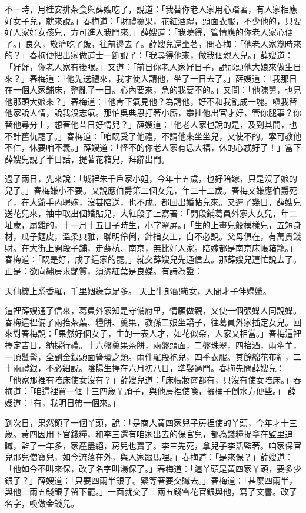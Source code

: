 \begin{showcontents}{}
不一時，月桂安排茶食與薛嫂吃了，說道：「我替你老人家用心踏著，有人家相應好女子兒，就來說。」春梅道：「財禮羹果，花紅酒禮，頭面衣服，不少他的，只要好人家好女孩兒，方可進入我門來。」薛嫂道：「我曉得，管情應的你老人家心便了。」良久，敬濟吃了飯，往前邊去了。薛嫂兒還坐著，問春梅：「他老人家幾時來的？」春梅便把出家做道士一節說了：「我尋得他來，做我個親人兒。」薛嫂道：「好好，你老人家有後眼。」又道：「前日你老人家好日子，說那頭他大娘來做生日來？」春梅道：「他先送禮來，我才使人請他，坐了一日去了。」薛嫂道：「我那日在一個人家鋪床，整亂了一日。心內要來，急的我要不的。」又問：「他陳舅，也見他那頭大娘來？」春梅道：「他肯下氣見他？為請他，好不和我亂成一塊。嗔我替他家說人情，說我沒志氣。那怕吳典恩打著小廝，攀扯他出官才好，管你腿事？你替他尋分上，想著他昔日好情兒？」薛嫂道：「他老人家也說的是，及到其間，也不計舊仇罷了。」春梅道：「咱既受了他禮，不請他來坐坐兒，又使不的。寧可教他不仁，休要咱不義。」薛嫂道：「怪不的你老人家有恁大福，休的心忒好了！」當下薛嫂兒說了半日話，提著花箱兒，拜辭出門。

過了兩日，先來說：「城裡朱千戶家小姐，今年十五歲，也好陪嫁，只是沒了娘的兒了。」春梅嫌小不要。又說應伯爵第二個女兒，年二十二歲。春梅又嫌應伯爵死了，在大爺手內聘嫁，沒甚陪送，也不成。都回出婚帖兒來。又遲了幾日，薛嫂兒送花兒來，袖中取出個婚貼兒，大紅段子上寫著：「開段鋪葛員外家大女兒，年二址歲，屬雞的，十一月十五日子時生，小字翠屏。」「生的上畫兒般模樣兒，五短身材，瓜子麵皮，溫柔典雅，聯明伶俐，針指女工，自不必說。父母俱在，有萬貫錢財。在大街上開段子鋪，走蘇杭、南京，無比好人家。陪嫁都是南京床帳箱籠。」春梅道：「既是好，成了這家的罷。」就交薛嫂兒先通信去。那薛嫂兒連忙說去了。正是：欲向繡房求艷質，須憑紅葉是良媒。有詩為證：

天仙機上系香羅，千里姻緣竟足多。
天上牛郎配織女，人間才子伴嬌娥。

這裡薛嫂通了信來，葛員外家知是守備府里，情願做親，又使一個張媒人同說媒。春梅這裡備了兩抬茶葉、糧餅、羹果，教孫二娘坐轎子，往葛員外家插定女兒。回來對春梅說：「果然好個女子，生的一表人才，如花似朵，人家又相當。」春梅這裡擇定吉日，納採行禮。十六盤羹果茶餅，兩盤頭面，二盤珠翠，四抬酒，兩牽羊，一頂鬒髻，全副金銀頭面簪環之類。兩件羅段袍兒，四季衣服。其餘綿花布絹，二十兩禮銀，不必細說。陰陽生擇在六月初八日，準娶過門。春梅先問薛嫂兒： 「他家那裡有陪床使女沒有？」薛嫂兒道：「床帳妝奩都有，只沒有使女陪床。」春梅道：「咱這裡買一個十三四歲丫頭子，與他房裡使喚，掇桶子倒水方便些。」 薛嫂道：「有，我明日帶一個來。」

到次日，果然領了一個丫頭，說：「是商人黃四家兒子房裡使的丫頭，今年才十三歲。黃四因用下官錢糧，和李三還有咱家出去的保官兒，都為錢糧捉拿在監里追贓，監了一年多，家產盡絕，房兒也賣了。李三先死，拿兒子李活監著。咱家保官兒那兒僧寶兒，如今流落在外，與人家跟馬哩。」春梅道：「是來保？」薛嫂道： 「他如今不叫來保，改了名字叫湯保了。」春梅道：「這丫頭是黃四家丫頭，要多少銀子？」薛嫂道：「只要四兩半銀子。緊等著要交贓去。」春梅道：「甚麼四兩半，與他三兩五錢銀子留下罷。」一面就交了三兩五錢雪花官銀與他，寫了文書。改了名字，喚做金錢兒。


\end{showcontents}
